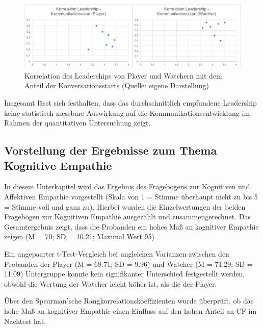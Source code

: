\begin{figure}[ht]
\centering
\includegraphics[width=1\linewidth]{content/pictures/Korrelation_Leaderhip_Start_of_conversation.png}
\caption{Korrelation des Leaderships von Player und Watchern mit dem Anteil der Konversationsstarts (Quelle: eigene Darstellung)}
\label{fig:correlation_leadership_conversation_starts}
\end{figure}

Insgesamt lässt sich festhalten, dass das durchschnittlich empfundene Leadership keine statistisch messbare Auswirkung auf die Kommunikationsentwicklung im Rahmen der quantitativen Untersuchung zeigt.

\subsection{Vorstellung der Ergebnisse zum Thema Kognitive Empathie}
In diesem Unterkapitel wird das Ergebnis des Fragebogens zur Kognitiven und Affektiven Empathie vorgestellt (Skala von 1 = Stimme überhaupt nicht zu bis 5 = Stimme voll und ganz zu). Hierbei wurden die Einzelwertungen der beiden Fragebögen zur Kognitiven Empathie ausgezählt und zusammengerechnet. Das Gesamtergebnis zeigt, dass die Probanden ein hohes Maß an kognitiver Empathie zeigen (M = 70; SD = 10.21; Maximal Wert 95). 

Ein ungepaarter t-Test-Vergleich bei ungleichen Varianzen zwischen den Probanden der Player (M = 68.71; SD = 9.96) und Watcher (M = 71.29; SD = 11.09) Untergruppe konnte kein signifikanter Unterschied festgestellt werden, obwohl die Wertung der Watcher leicht höher ist, als die der Player. 

Über den Spearman'sche Rangkorrelationskoeffizienten wurde überprüft, ob das hohe Maß an kognitiver Empathie einen Einfluss auf den hohen Anteil an \ac{CF} im Nachtest hat. 

